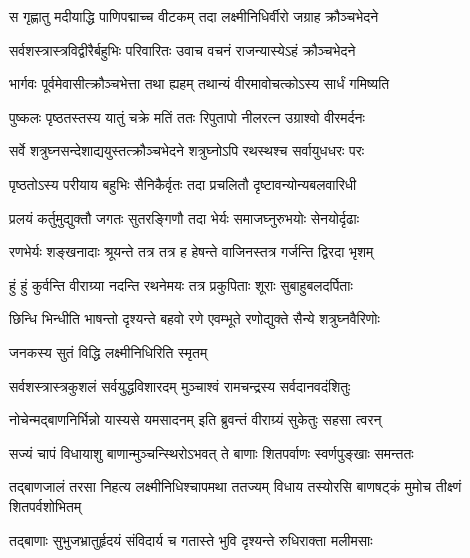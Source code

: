 \twolineshloka
{स गृह्णातु मदीयाद्धि पाणिपद्माच्च वीटकम्}
{तदा लक्ष्मीनिधिर्वीरो जग्राह क्रौञ्चभेदने}%

\twolineshloka
{सर्वशस्त्रास्त्रविद्वीरैर्बहुभिः परिवारितः}
{उवाच वचनं राजन्यास्येऽहं क्रौञ्चभेदने}%

\twolineshloka
{भार्गवः पूर्वमेवासीत्क्रौञ्चभेत्ता तथा ह्यहम्}
{तथान्यं वीरमावोचत्कोऽस्य सार्धं गमिष्यति}%

\twolineshloka
{पुष्कलः पृष्ठतस्तस्य यातुं चक्रे मतिं ततः}
{रिपुतापो नीलरत्न उग्राश्वो वीरमर्दनः}%

\twolineshloka
{सर्वे शत्रुघ्नसन्देशाद्ययुस्तत्क्रौञ्चभेदने}
{शत्रुघ्नोऽपि रथस्थश्च सर्वायुधधरः परः}%

\twolineshloka
{पृष्ठतोऽस्य परीयाय बहुभिः सैनिकैर्वृतः}
{तदा प्रचलितौ दृष्टावन्योन्यबलवारिधी}%

\twolineshloka
{प्रलयं कर्तुमुद्युक्तौ जगतः सुतरङ्गिणौ}
{तदा भेर्यः समाजघ्नुरुभयोः सेनयोर्दृढाः}%

\twolineshloka
{रणभेर्यः शङ्खनादाः श्रूयन्ते तत्र तत्र ह}
{हेषन्ते वाजिनस्तत्र गर्जन्ति द्विरदा भृशम्}%

\twolineshloka
{हुं हुं कुर्वन्ति वीराग्र्या नदन्ति रथनेमयः}
{तत्र प्रकुपिताः शूराः सुबाहुबलदर्पिताः}%

\twolineshloka
{छिन्धि भिन्धीति भाषन्तो दृश्यन्ते बहवो रणे}
{एवम्भूते रणोद्युक्ते सैन्ये शत्रुघ्नवैरिणोः}%



\onelineshloka
{जनकस्य सुतं विद्धि लक्ष्मीनिधिरिति स्मृतम्}%

\twolineshloka
{सर्वशस्त्रास्त्रकुशलं सर्वयुद्धविशारदम्}
{मुञ्चाश्वं रामचन्द्रस्य सर्वदानवदंशितुः}%

\twolineshloka
{नोचेन्मद्बाणनिर्भिन्नो यास्यसे यमसादनम्}
{इति ब्रुवन्तं वीराग्र्यं सुकेतुः सहसा त्वरन्}%

\twolineshloka
{सज्यं चापं विधायाशु बाणान्मुञ्चन्स्थिरोऽभवत्}
{ते बाणाः शितपर्वाणः स्वर्णपुङ्खाः समन्ततः}%


\fourlineindentedshloka
{तद्बाणजालं तरसा निहत्य}
{लक्ष्मीनिधिश्चापमथा ततज्यम्}
{विधाय तस्योरसि बाणषट्कं}
{मुमोच तीक्ष्णं शितपर्वशोभितम्}%

\twolineshloka
{तद्बाणाः सुभुजभ्रातुर्हृदयं संविदार्य च}
{गतास्ते भुवि दृश्यन्ते रुधिराक्ता मलीमसाः}%


